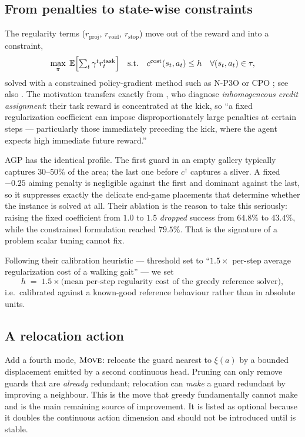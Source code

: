\documentclass[11pt,a4paper]{article}
\begin{document}
\subsection{From penalties to state-wise constraints}

The regularity terms ($r_{\mathrm{proj}}$, $r_{\mathrm{void}}$, $r_{\mathrm{stop}}$) move out of
the reward and into a constraint,
\[
  \max_\pi \; \mathbb{E}\Bigl[\textstyle\sum_t \gamma^t r^{\mathrm{task}}_t\Bigr]
  \quad\text{s.t.}\quad
  c^{\mathrm{cost}}(s_t,a_t) \le h \quad \forall (s_t,a_t)\in\tau ,
\]
solved with a constrained policy-gradient method such as N-P3O \cite{lee2023constrained} or
CPO \cite{achiam2017cpo}; see also \citet{altman1999}. The motivation transfers exactly from
\citet{xu2025striker}, who diagnose \emph{inhomogeneous credit assignment}: their task reward
is concentrated at the kick, so ``a fixed regularization coefficient can impose
disproportionately large penalties at certain steps --- particularly those immediately
preceding the kick, where the agent expects high immediate future reward.''

AGP has the identical profile. The first guard in an empty gallery typically captures
$30$--$50\%$ of the area; the last one before $c^\dagger$ captures a sliver. A fixed
$-0.25$ aiming penalty is negligible against the first and dominant against the last, so it
suppresses exactly the delicate end-game placements that determine whether the instance is
solved at all. Their ablation is the reason to take this seriously: raising the fixed
coefficient from $1.0$ to $1.5$ \emph{dropped} success from $64.8\%$ to $43.4\%$, while the
constrained formulation reached $79.5\%$. That is the signature of a problem scalar tuning
cannot fix.

Following their calibration heuristic --- threshold set to ``$1.5\times$ per-step average
regularization cost of a walking gait'' --- we set
\[
  h \;=\; 1.5 \times \bigl(\text{mean per-step regularity cost of the greedy reference solver}\bigr),
\]
i.e.\ calibrated against a known-good reference behaviour rather than in absolute units.

\subsection{A relocation action}

Add a fourth mode, $\textsc{Move}$: relocate the guard nearest to $\xi(a)$ by a bounded
displacement emitted by a second continuous head. Pruning can only remove guards that are
\emph{already} redundant; relocation can \emph{make} a guard redundant by improving a
neighbour. This is the move that greedy fundamentally cannot make and is the main remaining
source of improvement. It is listed as optional because it doubles the continuous action
dimension and should not be introduced until \stageII{} is stable.
\end{document}
